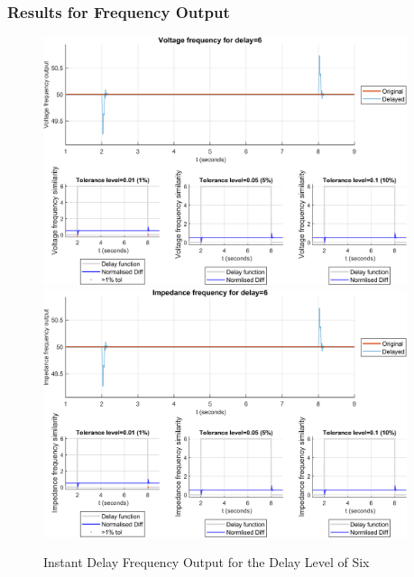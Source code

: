 \subsubsection{Results for Frequency Output}


\begin{figure}
    \caption{Instant Delay Frequency Output for the Delay Level of Six}
    \includegraphics[width=0.95\textwidth]{PMUsim-figures/DelayOf_6/Instant_vFrequency.png}    
    \label{fig:PMUsim_Six_vFrequency}
    \includegraphics[width=0.95\textwidth]{PMUsim-figures/DelayOf_6/Instant_iFrequency.png}    
    \label{fig:PMUsim_Six_Frequency}
        \begin{small}
     \end{small}
\end{figure}


